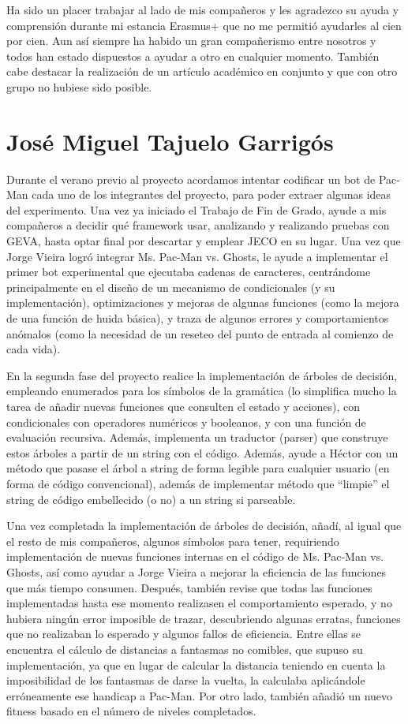 Ha sido un placer trabajar al lado de mis compañeros y les agradezco su ayuda y comprensión durante mi estancia Erasmus+ que no me permitió ayudarles al cien por cien. Aun así siempre ha habido un gran compañerismo entre nosotros y todos han estado dispuestos a ayudar a otro en cualquier momento. También cabe destacar la realización de un artículo académico en conjunto y que con otro grupo no hubiese sido posible.


\section{José Miguel Tajuelo Garrigós}
Durante el verano previo al proyecto acordamos intentar codificar un bot de Pac-Man cada uno de los integrantes del proyecto, para poder extraer algunas ideas del experimento. Una vez ya iniciado el Trabajo de Fin de Grado, ayude a mis compañeros a decidir qué framework usar, analizando y realizando pruebas con GEVA, hasta optar final por descartar y emplear JECO en su lugar. Una vez que Jorge Vieira logró integrar Ms. Pac-Man vs. Ghosts, le ayude a implementar el primer bot experimental que ejecutaba cadenas de caracteres, centrándome principalmente en el diseño de un mecanismo de condicionales (y su implementación), optimizaciones y mejoras de algunas funciones (como la mejora de una función de huida básica), y traza de algunos errores y comportamientos anómalos (como la necesidad de un reseteo del punto de entrada al comienzo de cada vida).
 
En la segunda fase del proyecto realice la implementación de árboles de decisión, empleando enumerados para los símbolos de la gramática (lo simplifica mucho la tarea de añadir nuevas funciones que consulten el estado y acciones), con condicionales con operadores numéricos y booleanos, y con una función de evaluación recursiva. Además, implementa un traductor (parser) que construye estos árboles a partir de un string con el código. Además, ayude a Héctor con un método que pasase el árbol a string de forma legible para cualquier usuario (en forma de código convencional), además de implementar método que “limpie” el string de código embellecido (o no) a un string si parseable.
 
Una vez completada la implementación de árboles de decisión, añadí, al igual que el resto de mis compañeros, algunos símbolos para tener, requiriendo implementación de nuevas funciones internas en el código de Ms. Pac-Man vs. Ghosts, así como ayudar a Jorge Vieira a mejorar la eficiencia de las funciones que más tiempo consumen. Después, también revise que todas las funciones implementadas hasta ese momento realizasen el comportamiento esperado, y no hubiera ningún error imposible de trazar, descubriendo algunas erratas, funciones que no realizaban lo esperado y algunos fallos de eficiencia. Entre ellas se encuentra el cálculo de distancias a fantasmas no comibles, que supuso su implementación, ya que en lugar de calcular la distancia teniendo en cuenta la imposibilidad de los fantasmas de darse la vuelta, la calculaba aplicándole erróneamente ese handicap a Pac-Man. Por otro lado, también añadió un nuevo fitness basado en el número de niveles completados.
 
